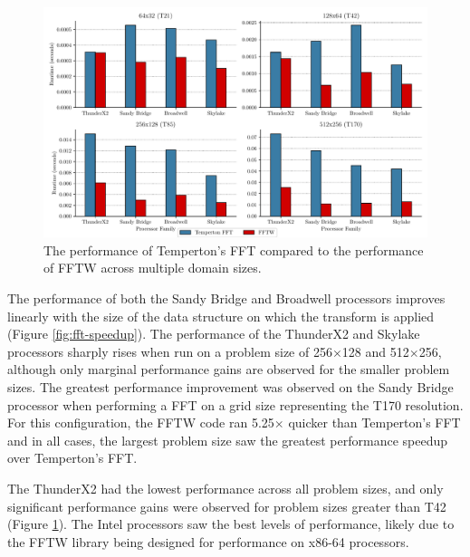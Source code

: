 \documentclass[a4paper,11pt]{report}
\begin{document}
\begin{figure}[htbp]
    \centering
    \includegraphics[width=1\textwidth]{img/compare_fft.pdf}
    \caption[Performance comparison of FFTW and Temperton's FFT]{The performance of Temperton's FFT compared to the performance of FFTW across multiple domain sizes.  }
    \label{fig:fft-times}
\end{figure}
\par
The performance of both the Sandy Bridge and Broadwell processors improves linearly with the size of the data structure on which the transform is applied (Figure \ref{fig:fft-speedup}). The performance of the ThunderX2 and Skylake processors sharply rises when run on a problem size of 256$\times$128 and 512$\times$256, although only marginal performance gains are observed for the smaller problem sizes. The greatest performance improvement was observed on the Sandy Bridge processor when performing a FFT on a grid size representing the T170 resolution. For this configuration, the FFTW code ran 5.25$\times$ quicker than Temperton's FFT and in all cases, the largest problem size saw the greatest performance speedup over Temperton's FFT.
\par
The ThunderX2 had the lowest performance across all problem sizes, and only significant performance gains were observed for problem sizes greater than T42 (Figure \ref{fig:fft-times}). The Intel processors saw the best levels of performance, likely due to the FFTW library being designed for performance on x86-64 processors. 
\end{document}
